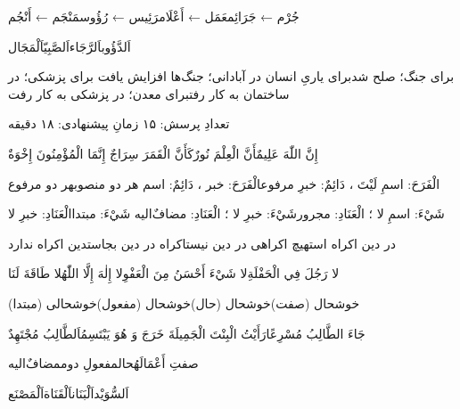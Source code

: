 {جُرْم ← جَرَائِم}{عَمَل ← أَعْلَام}{رَئِيس ← رُؤُوس}{مَنْجَم ← أَنْجُم}

{اَلدَّؤُوب}{اَلرَّجَاء}{اَلصَّبِيّ}{اَلْمَجَال}

{برای جنگ؛ صلح شد}{برای یاریِ انسان در آبادانی؛ جنگ‌ها افزایش یافت}
{برای پزشکی؛ در ساختمان به کار رفت}{برای معدن؛ در پزشکی به کار رفت}

{\JUIFont\small\color{JMuted}تعدادِ پرسش: ۱۵ \quad\textbullet\quad زمانِ
پیشنهادی: ۱۸ دقیقه\par}
\JResetQ

{إِنَّ اللّٰهَ عَلِيمٌ}{أَنَّ الْعِلْمَ نُورٌ}{كَأَنَّ الْقَمَرَ سِرَاجٌ}
{إِنَّمَا الْمُؤْمِنُونَ إِخْوَةٌ}

{الْفَرَحَ: اسمِ لَيْتَ ، دَائِمٌ: خبرِ مرفوع}{الْفَرَحَ: خبر ، دَائِمٌ: اسم}
{هر دو منصوب}{هر دو مرفوع}

{شَيْءَ: اسمِ لا ؛ الْعَنَادِ: مجرور}{شَيْءَ: خبرِ لا ؛ الْعَنَادِ: مضافٌ‌الیه}
{شَيْءَ: مبتدا}{الْعَنَادِ: خبرِ لا}

{در دین اکراه است}{هیچ اکراهی در دین نیست}{اکراه در دین بجاست}{دین اکراه ندارد}

{لا رَجُلَ فِي الْحَفْلَةِ}{لا شَيْءَ أَحْسَنُ مِنَ الْعَفْوِ}{لا إِلٰهَ
إِلَّا اللّٰهُ}{لا طَاقَةَ لَنَا}

{خوشحال (صفت)}{خوشحال (حال)}{خوشحال (مفعول)}{خوشحالی (مبتدا)}

{جَاءَ الطَّالِبُ مُسْرِعًا}{رَأَيْتُ الْبِنْتَ الْجَمِيلَةَ}
{خَرَجَ وَ هُوَ يَبْتَسِمُ}{اَلطَّالِبُ مُجْتَهِدٌ}

{صفتِ أَعْمَالَهُ}{حال}{مفعولِ دوم}{مضافٌ‌الیه}

{اَلسُّوَيْد}{اَلْبَنَان}{اَلْقَنَاة}{اَلْمَصْنَع}


